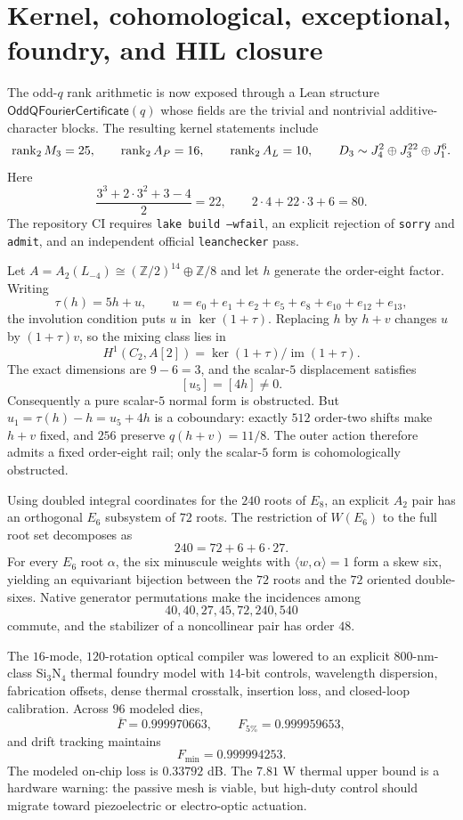 \section{Kernel, cohomological, exceptional, foundry, and HIL closure}
\label{sec:levi-v4-closure}

The odd-$q$ rank arithmetic is now exposed through a Lean structure
$\mathsf{OddQFourierCertificate}(q)$ whose fields are the trivial and
nontrivial additive-character blocks.  The resulting kernel statements include
\[
 \operatorname{rank}_2 M_3=25,\qquad \operatorname{rank}_2 A_P=16,\qquad \operatorname{rank}_2 A_L=10,
 \qquad D_3\sim J_4^2\oplus J_3^{22}\oplus J_1^6.
\]
Here
\[
 \frac{3^3+2\cdot3^2+3-4}{2}=22,
 \qquad 2\cdot4+22\cdot3+6=80.
\]
The repository CI requires \texttt{lake build --wfail}, an explicit rejection
of \texttt{sorry} and \texttt{admit}, and an independent official
\texttt{leanchecker} pass.

Let $A=A_2(L_{-4})\cong(\mathbb Z/2)^{14}\oplus\mathbb Z/8$ and let $h$
generate the order-eight factor.  Writing
\[
 \tau(h)=5h+u,
 \qquad
 u=e_0+e_1+e_2+e_5+e_8+e_{10}+e_{12}+e_{13},
\]
the involution condition puts $u$ in $\ker(1+\tau)$.  Replacing $h$ by $h+v$
changes $u$ by $(1+\tau)v$, so the mixing class lies in
\[
 H^1(C_2,A[2])=\ker(1+\tau)/\operatorname{im}(1+\tau).
\]
The exact dimensions are $9-6=3$, and the scalar-$5$ displacement satisfies
\[
 \boxed{[u_5]=[4h]\ne0.}
\]
Consequently a pure scalar-$5$ normal form is obstructed.  But
$u_1=\tau(h)-h=u_5+4h$ is a coboundary: exactly $512$ order-two shifts
make $h+v$ fixed, and $256$ preserve $q(h+v)=11/8$.  The outer action
therefore admits a fixed order-eight rail; only the scalar-$5$ form is
cohomologically obstructed.

Using doubled integral coordinates for the $240$ roots of $E_8$, an explicit
$A_2$ pair has an orthogonal $E_6$ subsystem of $72$ roots.  The restriction of
$W(E_6)$ to the full root set decomposes as
\[
 \boxed{240=72+6+6\cdot27}.
\]
For every $E_6$ root $\alpha$, the six minuscule weights with
$\langle w,\alpha\rangle=1$ form a skew six, yielding an equivariant bijection
between the $72$ roots and the $72$ oriented double-sixes.  Native generator
permutations make the incidences among
\[
 40,40,27,45,72,240,540
\]
commute, and the stabilizer of a noncollinear pair has order $48$.

The $16$-mode, $120$-rotation optical compiler was lowered to an explicit
800-nm-class Si$_3$N$_4$ thermal foundry model with $14$-bit controls, wavelength
dispersion, fabrication offsets, dense thermal crosstalk, insertion loss, and
closed-loop calibration.  Across $96$ modeled dies,
\[
 \overline F=0.999970663,
 \qquad F_{5\%}=0.999959653,
\]
and drift tracking maintains
\[
 F_{\min}=0.999994253.
\]
The modeled on-chip loss is $0.33792$ dB.  The $7.81$ W thermal upper bound is a
hardware warning: the passive mesh is viable, but high-duty control should
migrate toward piezoelectric or electro-optic actuation.

